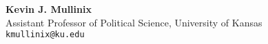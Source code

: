\documentclass[margin,line,pifont,palatino,courier]{res}
\begin{document}
\begin{resume}


\textbf{Kevin J. Mullinix} \\
Assistant Professor of Political Science, University of Kansas \\
\texttt{kmullinix@ku.edu}\\

\end{resume}
\end{document}
